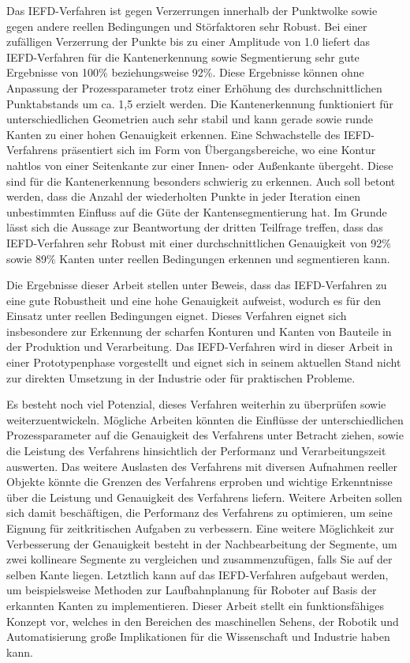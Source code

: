 Das IEFD-Verfahren ist gegen Verzerrungen innerhalb der Punktwolke sowie gegen andere reellen Bedingungen und Störfaktoren sehr Robust. Bei einer zufälligen Verzerrung der Punkte bis zu einer Amplitude von 1.0 liefert das IEFD-Verfahren für die Kantenerkennung sowie Segmentierung sehr gute Ergebnisse von 100\% beziehungsweise 92\%. Diese Ergebnisse können ohne Anpassung der Prozessparameter trotz einer Erhöhung des durchschnittlichen Punktabstands um ca. 1,5 erzielt werden. Die Kantenerkennung funktioniert für unterschiedlichen Geometrien auch sehr stabil und kann gerade sowie runde Kanten zu einer hohen Genauigkeit erkennen. Eine Schwachstelle des IEFD-Verfahrens präsentiert sich im Form von Übergangsbereiche, wo eine Kontur nahtlos von einer Seitenkante zur einer Innen- oder Außenkante übergeht. Diese sind für die Kantenerkennung besonders schwierig zu erkennen. Auch soll betont werden, dass die Anzahl der wiederholten Punkte in jeder Iteration einen unbestimmten Einfluss auf die Güte der Kantensegmentierung hat. Im Grunde lässt sich die Aussage zur Beantwortung der dritten Teilfrage treffen, dass das IEFD-Verfahren sehr Robust mit einer durchschnittlichen Genauigkeit von 92\% sowie 89\% Kanten unter reellen Bedingungen erkennen und segmentieren kann. 

Die Ergebnisse dieser Arbeit stellen unter Beweis, dass das IEFD-Verfahren zu eine gute Robustheit und eine hohe Genauigkeit aufweist, wodurch es für den Einsatz unter reellen Bedingungen eignet. Dieses Verfahren eignet sich insbesondere zur Erkennung der scharfen Konturen und Kanten von Bauteile in der Produktion und Verarbeitung. Das IEFD-Verfahren wird in dieser Arbeit in einer Prototypenphase vorgestellt und eignet sich in seinem aktuellen Stand nicht zur direkten Umsetzung in der Industrie oder für praktischen Probleme. 

Es besteht noch viel Potenzial, dieses Verfahren weiterhin zu überprüfen sowie weiterzuentwickeln. Mögliche Arbeiten könnten die Einflüsse der unterschiedlichen Prozessparameter auf die Genauigkeit des Verfahrens unter Betracht ziehen, sowie die Leistung des Verfahrens hinsichtlich der Performanz und Verarbeitungszeit auswerten. Das weitere Auslasten des Verfahrens mit diversen Aufnahmen reeller Objekte könnte die Grenzen des Verfahrens erproben und wichtige Erkenntnisse über die Leistung und Genauigkeit des Verfahrens liefern. Weitere Arbeiten sollen sich damit beschäftigen, die Performanz des Verfahrens zu optimieren, um seine Eignung für zeitkritischen Aufgaben zu verbessern. Eine weitere Möglichkeit zur Verbesserung der Genauigkeit besteht in der Nachbearbeitung der Segmente, um zwei kollineare Segmente zu vergleichen und zusammenzufügen, falls Sie auf der selben Kante liegen. Letztlich kann auf das IEFD-Verfahren aufgebaut werden, um beispielsweise Methoden zur Laufbahnplanung für Roboter auf Basis der erkannten Kanten zu implementieren. Dieser Arbeit stellt ein funktionsfähiges Konzept vor, welches in den Bereichen des maschinellen Sehens, der Robotik und Automatisierung große Implikationen für die Wissenschaft und Industrie haben kann.